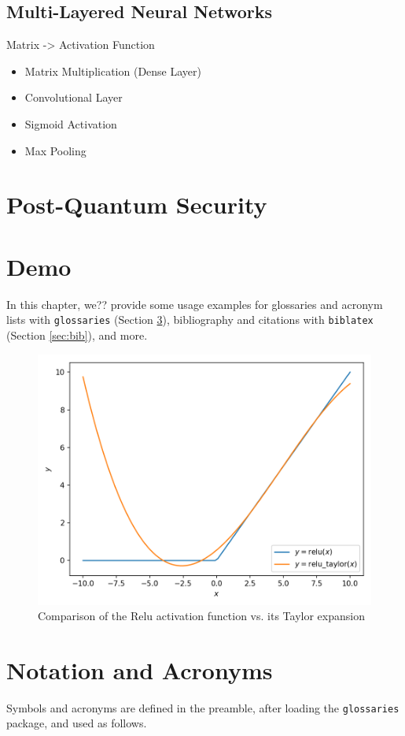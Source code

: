 \subsection{Multi-Layered Neural Networks}
Matrix -> Activation Function
\begin{itemize}
    \item Matrix Multiplication (Dense Layer)
    \item Convolutional Layer
    \item Sigmoid Activation
    \item Max Pooling
\end{itemize}

\section{Post-Quantum Security}

\section{Demo}
In this chapter, we?? provide some usage examples for
glossaries and acronym lists with \texttt{glossaries} (Section \ref{sec:gloss}),
bibliography and citations with \texttt{biblatex} (Section \ref{sec:bib}), and more.

\begin{figure}[H]
    \centering
    \includegraphics[width=0.8\linewidth]{figures/taylor-relu.png}
    \caption{Comparison of the Relu activation function vs. its Taylor expansion}
\end{figure}

\section{Notation and Acronyms}
\label{sec:gloss}
Symbols and acronyms are defined in the preamble, after loading the \texttt{glossaries} package, and used as follows.

